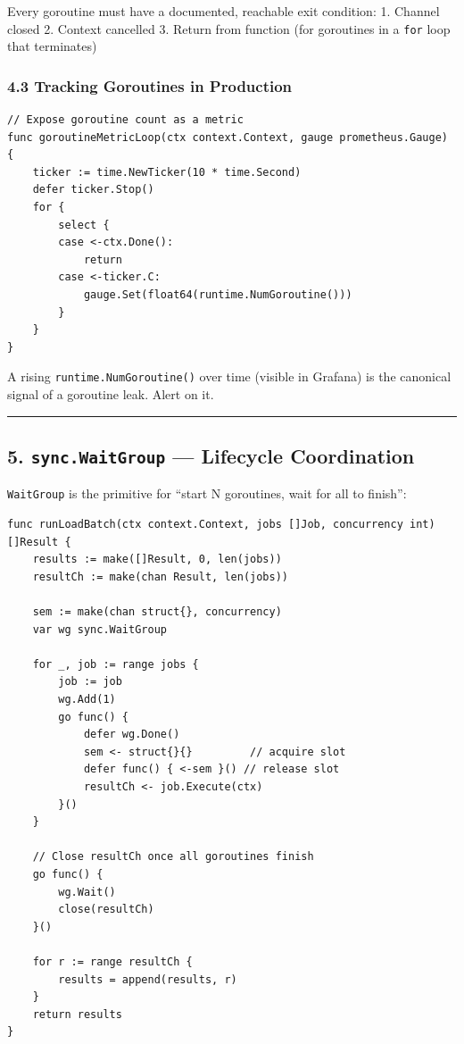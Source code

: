\documentclass[11pt,a4paper,oneside]{book}
\begin{document}
Every goroutine must have a documented, reachable exit condition: 1.
Channel closed 2. Context cancelled 3. Return from function (for
goroutines in a \texttt{for} loop that terminates)

\subsubsection{4.3 Tracking Goroutines in
Production}

\begin{verbatim}
// Expose goroutine count as a metric
func goroutineMetricLoop(ctx context.Context, gauge prometheus.Gauge) {
    ticker := time.NewTicker(10 * time.Second)
    defer ticker.Stop()
    for {
        select {
        case <-ctx.Done():
            return
        case <-ticker.C:
            gauge.Set(float64(runtime.NumGoroutine()))
        }
    }
}
\end{verbatim}

A rising \texttt{runtime.NumGoroutine()} over time (visible in Grafana)
is the canonical signal of a goroutine leak. Alert on it.

\begin{center}\rule{0.5\linewidth}{0.5pt}\end{center}

\subsection{\texorpdfstring{5. \texttt{sync.WaitGroup} --- Lifecycle
Coordination}{5. sync.WaitGroup --- Lifecycle Coordination}}

\texttt{WaitGroup} is the primitive for ``start N goroutines, wait for
all to finish'':

\begin{verbatim}
func runLoadBatch(ctx context.Context, jobs []Job, concurrency int) []Result {
    results := make([]Result, 0, len(jobs))
    resultCh := make(chan Result, len(jobs))

    sem := make(chan struct{}, concurrency)
    var wg sync.WaitGroup

    for _, job := range jobs {
        job := job
        wg.Add(1)
        go func() {
            defer wg.Done()
            sem <- struct{}{}         // acquire slot
            defer func() { <-sem }() // release slot
            resultCh <- job.Execute(ctx)
        }()
    }

    // Close resultCh once all goroutines finish
    go func() {
        wg.Wait()
        close(resultCh)
    }()

    for r := range resultCh {
        results = append(results, r)
    }
    return results
}
\end{verbatim}
\end{document}
